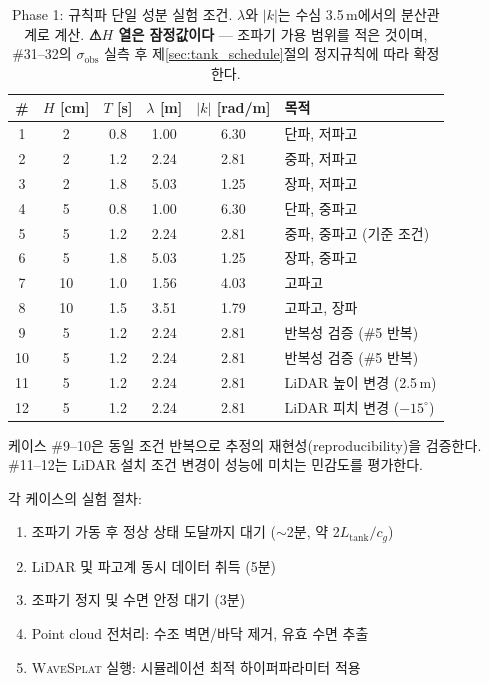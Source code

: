 \documentclass[11pt]{report}
\numberwithin{equation}{chapter}
\numberwithin{figure}{chapter}
\numberwithin{table}{chapter}
\newcommand{\WS}{\textsc{WaveSplat}}
\begin{document}
\begin{table}[H]
\centering
\caption{Phase 1: 규칙파 단일 성분 실험 조건.
  $\lambda$와 $|k|$는 수심 3.5\,m에서의 분산관계로 계산.
  \textbf{⚠$H$ 열은 잠정값이다} --- 조파기 가용 범위를 적은 것이며,
  \#31--32의 $\sigma_{\text{obs}}$ 실측 후 제\ref{sec:tank_schedule}절의
  정지규칙에 따라 확정한다.}
\label{tab:tank_phase1}
\begin{tabular}{cccccl}
\toprule
\# & $H$ [cm] & $T$ [s] & $\lambda$ [m] & $|k|$ [rad/m] & 목적 \\
\midrule
1  & 2 & 0.8 & 1.00 & 6.30  & 단파, 저파고 \\
2  & 2 & 1.2 & 2.24 & 2.81  & 중파, 저파고 \\
3  & 2 & 1.8 & 5.03 & 1.25  & 장파, 저파고 \\
4  & 5 & 0.8 & 1.00 & 6.30  & 단파, 중파고 \\
5  & 5 & 1.2 & 2.24 & 2.81  & 중파, 중파고 (기준 조건) \\
6  & 5 & 1.8 & 5.03 & 1.25  & 장파, 중파고 \\
7  & 10 & 1.0 & 1.56 & 4.03  & 고파고 \\
8  & 10 & 1.5 & 3.51 & 1.79  & 고파고, 장파 \\
\midrule
9  & 5 & 1.2 & 2.24 & 2.81  & 반복성 검증 (\#5 반복) \\
10 & 5 & 1.2 & 2.24 & 2.81  & 반복성 검증 (\#5 반복) \\
11 & 5 & 1.2 & 2.24 & 2.81  & LiDAR 높이 변경 (2.5\,m) \\
12 & 5 & 1.2 & 2.24 & 2.81  & LiDAR 피치 변경 ($-15^\circ$) \\
\bottomrule
\end{tabular}
\end{table}

케이스 \#9--10은 동일 조건 반복으로 추정의 재현성(reproducibility)을 검증한다.
\#11--12는 LiDAR 설치 조건 변경이 성능에 미치는 민감도를 평가한다.

각 케이스의 실험 절차:
\begin{enumerate}
  \item 조파기 가동 후 정상 상태 도달까지 대기 ($\sim$2분, 약 2$L_{\text{tank}}/c_g$)
  \item LiDAR 및 파고계 동시 데이터 취득 (5분)
  \item 조파기 정지 및 수면 안정 대기 (3분)
  \item Point cloud 전처리: 수조 벽면/바닥 제거, 유효 수면 추출
  \item \WS{} 실행: 시뮬레이션 최적 하이퍼파라미터 적용
\end{enumerate}
\end{document}
